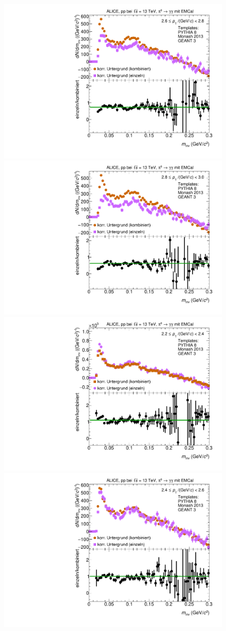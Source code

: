 \begin{figure}[t]
\begin{multicols}{2}
\end{multicols}
\begin{multicols}{2}
    \includegraphics[width=.65\linewidth]{Anhang/BackgroundWithRatio07_Data_2016.pdf}\par
    \includegraphics[width=.65\linewidth]{Anhang/BackgroundWithRatio08_Data_2016.pdf}\par
\end{multicols}
\begin{multicols}{2}
    \includegraphics[width=.65\linewidth]{Anhang/BackgroundWithRatio05_Data_2016.pdf}\par
    \includegraphics[width=.65\linewidth]{Anhang/BackgroundWithRatio06_Data_2016.pdf}\par
\end{multicols}
\end{figure}
\clearpage

